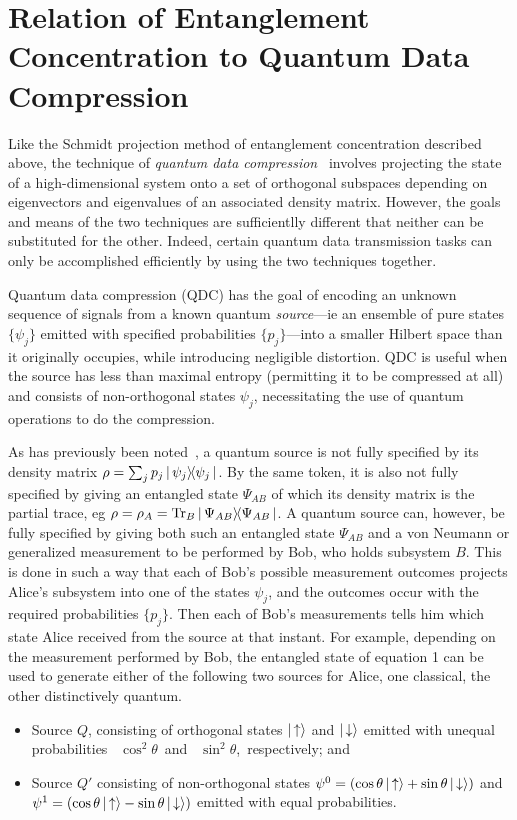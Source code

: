 \section{Relation of Entanglement Concentration to Quantum
Data Compression}
 
Like the Schmidt projection method of entanglement concentration
described above, the technique of {\sl quantum data
compression\/}~\cite{JS94,Schu95} involves projecting the state of a
high-dimensional system onto a set of orthogonal subspaces depending on
eigenvectors and eigenvalues of an associated density matrix.  However,
the goals and means of the two techniques are sufficientlly different
that neither can be substituted for the other. Indeed, certain quantum
data transmission tasks can only be accomplished efficiently by using
the two techniques together.
 
Quantum data compression (QDC) has the goal of encoding an unknown
sequence of signals from a known quantum {\sl source\/}---ie an ensemble
of pure states $\{\psi_j\}$ emitted with specified probabilities
$\{p_j\}$---into a smaller Hilbert space than it originally occupies,
while introducing negligible distortion.  QDC is useful when the source
has less than maximal entropy (permitting it to be compressed at all) and
consists of non-orthogonal states $\psi_j$, necessitating the use of
quantum operations to do the compression.
 
As has previously been noted~\cite{Schu95,BBJMPSW94,JSV95}, a
quantum  source is not fully specified by its density matrix
$\rho = \sum_jp_j \left | \, \psi_j \right \rangle\!\!\left \langle \psi_j \, \right |$.  By the same token, it is also not
fully specified by giving an entangled state $\Psi_{AB}$ of which its
density matrix is the partial trace, eg
$\rho=\rho_A=\mbox{\rm Tr}_B\left | \, \Psi_{AB} \right \rangle\!\!\left \langle \Psi_{AB} \, \right |$.  A quantum source can, however, be
fully specified by giving both such an entangled state $\Psi_{AB}$ and a
von Neumann or generalized measurement to be performed by Bob, who holds
subsystem $B$.  This is done in such a way that each of Bob's possible
measurement outcomes projects Alice's subsystem into one of the states
$\psi_j$, and the outcomes occur with the required probabilities
$\{p_j\}$. Then each of Bob's measurements tells him which state Alice
received from the source at that instant.  For example, depending on the
measurement performed by Bob, the entangled state of equation 1 can be
used to generate either of the following two sources for Alice, one
classical, the other distinctively quantum.
 \begin{itemize}
\item Source $Q$, consisting of orthogonal states
$\left | \, \uparrow \right \rangle$ and
$\left | \, \downarrow \right \rangle$ emitted with unequal probabilities \,
$\cos^2\theta$\, and \, $\sin^2\theta$,\, respectively; and
\item Source $Q'$ consisting of non-orthogonal states
$\psi^0=(\cos\theta\left | \, \uparrow \right \rangle+\sin\theta\left | \, \downarrow \right \rangle)$
 and
$\psi^1=(\cos\theta\left | \, \uparrow \right \rangle-\sin\theta\left | \, \downarrow \right \rangle)$
emitted with equal probabilities.
\end{itemize}
 
